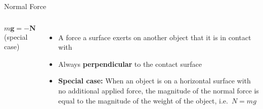 \documentclass[12pt,compress,aspectratio=169]{beamer}
\begin{document}
\begin{frame}{Normal Force}
  \begin{columns}
    \centering
    
    $m\bm g=-\bm N$\\(special case)
    
    \begin{itemize}
    \item A force a surface exerts on another object that it is in contact with
    \item Always \textbf{perpendicular} to the contact surface
    \item\textbf{Special case:} When an object is on a horizontal surface
      with no additional applied force, the magnitude of the normal force is
      equal to the magnitude of the weight of the object, i.e.\ $N=mg$
    \end{itemize}
  \end{columns}
\end{frame}
\end{document}
